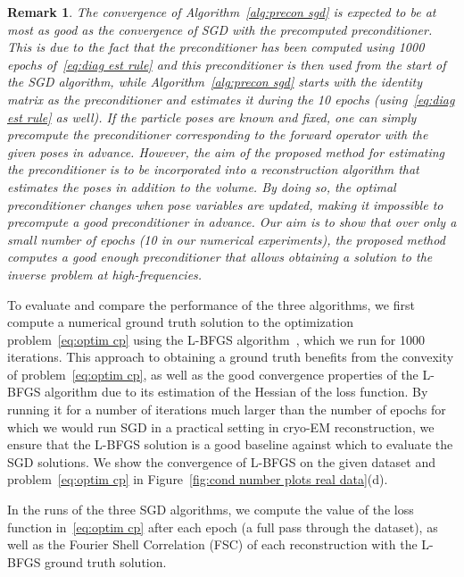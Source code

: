 \documentclass{article}
\newtheorem{remark}[theorem]{Remark}%
\begin{document}
\begin{remark}
    The convergence of Algorithm~\ref{alg:precon sgd} is expected to be at most as 
    good as the convergence of SGD with the precomputed preconditioner. 
    This is due to the fact that the preconditioner has been computed using 1000
    epochs of~\eqref{eq:diag est rule} and this preconditioner is then used
    from the start of the SGD algorithm, while Algorithm~\ref{alg:precon sgd}
    starts with the identity matrix as the preconditioner and estimates it during
    the 10 epochs (using~\eqref{eq:diag est rule} as well). 
    If the particle poses are known and fixed, one can simply precompute 
    the preconditioner corresponding to the forward operator with the given poses in advance.
    However, the aim of the proposed method for estimating the
    preconditioner is to be incorporated into a reconstruction algorithm that
    estimates the poses in addition to the volume. By doing so, the optimal 
    preconditioner changes when pose variables are updated, making it impossible
    to precompute a good preconditioner in advance. Our aim is to show that over
    only a small number of epochs (10 in our numerical experiments), 
    the proposed method computes a good enough preconditioner that allows obtaining 
    a solution to the inverse problem at high-frequencies.
\end{remark}

To evaluate and compare the performance of the three algorithms, we first compute a numerical ground truth solution to the optimization problem~\eqref{eq:optim cp} using the L-BFGS algorithm~\cite{liu_limited_1989}, which we run for 1000 iterations. 
This approach to obtaining a ground truth benefits from the convexity of problem~\eqref{eq:optim cp}, as well as the good convergence properties of the L-BFGS algorithm due to its estimation of the Hessian of the loss function. 
By running it for a number of iterations much larger than the number of epochs for which we would run SGD in a practical setting in cryo-EM reconstruction, we ensure that the L-BFGS solution is a good baseline against which to evaluate the SGD solutions.
We show the convergence of L-BFGS on the given dataset and problem~\eqref{eq:optim cp} in Figure~\ref{fig:cond number plots real data}(d).

In the runs of the three SGD algorithms, we compute the value of the loss function in~\eqref{eq:optim cp} after each epoch (a full pass through the dataset), as well as the Fourier Shell Correlation (FSC) of each reconstruction with the L-BFGS ground truth solution.
\end{document}
